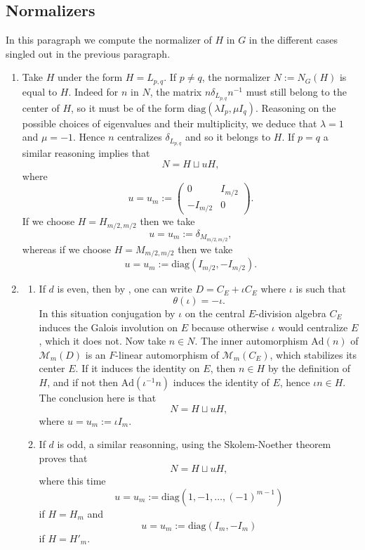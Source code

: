 \documentclass[11pt,letterpaper]{amsart}
\newcommand{\CM}{{\mathcal {M}}} \newcommand{\CN}{{\mathcal {N}}}\newcommand{\CO}{{\mathcal {O}}}\newcommand{\CP}{{\mathcal {P}}}
\newcommand{\Ad}{\mathrm{Ad}}
\def\d{\delta}
\def\diag{\mathrm{diag}}
\theoremstyle{plain}
\numberwithin{equation}{section}
\begin{document}
	
\subsection{Normalizers}\label{sec normalizer}

In this paragraph we compute the normalizer of $H$ in $G$ in the different cases singled out in the previous paragraph.


\begin{enumerate}[1)]
\item Take $H$ under the form $H=L_{p,q}$. If $p\neq q$, the normalizer $N:=N_G(H)$ is equal to $H$. Indeed for $n$ in $N$, the matrix $n\d_{L_{p,q}}n^{-1}$ must still belong to the center of $H$, so it must be of the form $\diag(\lambda I_p, \mu I_q)$. Reasoning on the possible choices of eigenvalues and their multiplicity, we deduce that $\lambda=1$ and $\mu=-1$. Hence $n$ centralizes $\d_{L_{p,q}}$ and so it belongs to $H$. If $p=q$ a similar reasoning implies that 
\[N=H\sqcup u H,\] where 
\[u=u_m:=\begin{pmatrix} 0 & I_{m/2} \\ -I_{m/2} & 0 \end{pmatrix}.\] If we choose $H=H_{m/2,m/2}$ then we take 
\[u=u_m:=\d_{M_{m/2,m/2}},\] whereas if 
we choose $H=M_{m/2,m/2}$ then we take 
\[u=u_m:=\diag(I_{m/2},-I_{m/2}).\]
\item 
\begin{enumerate} 
\item If $d$ is even, then by \cite{Ch}, one can write $D=C_E+\iota C_E$ where $\iota$ is such that \[\theta(\iota )=-\iota .\] In this situation conjugation by $\iota$ on the central $E$-division algebra $C_E$ induces the Galois involution on $E$ because otherwise $\iota $ would centralize $E$, which it does not. Now take $n\in N$. The inner automorphism $\Ad(n)$ of $\CM_m(D)$ is an $F$-linear automorphism of $\CM_m(C_E)$, which stabilizes its center $E$. If it induces the identity on $E$, then $n\in H$ by the definition of $H$, and if not then $\Ad(\iota ^{-1} n )$ induces the identity of $E$, hence $\iota n\in H $. The conclusion here is that 
\[N=H\sqcup u H,\] where $u=u_m:=\iota I_m$.
\item If $d$ is odd, a similar reasonning, using the Skolem-Noether theorem proves that 
\[N=H\sqcup uH,\] where this time 
\[u=u_m:=\diag(1 , -1,\dots ,(-1)^{m-1})\] if $H=H_m$ and 
\[u=u_m:=\diag(I_m,-I_m)\] if $H=H'_m$.
\end{enumerate}
\end{enumerate}
\end{document}

